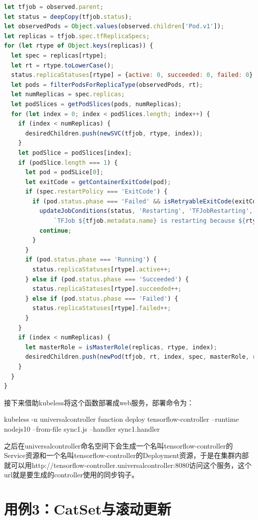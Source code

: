 \documentclass[macfonts,master]{njuthesis}
\begin{document}
\begin{lstlisting}[language=JavaScript,caption=tensorflowjob-controller的实现代码,label=listing:tensorflowjob-controller]
let tfjob = observed.parent;
let status = deepCopy(tfjob.status);
let observedPods = Object.values(observed.children['Pod.v1']);
let replicas = tfjob.spec.tfReplicaSpecs;
for (let rtype of Object.keys(replicas)) {
  let spec = replicas[rtype];
  let rt = rtype.toLowerCase();
  status.replicaStatuses[rtype] = {active: 0, succeeded: 0, failed: 0};
  let pods = filterPodsForReplicaType(observedPods, rt);
  let numReplicas = spec.replicas;
  let podSlices = getPodSlices(pods, numReplicas);
  for (let index = 0; index < podSlices.length; index++) {
    if (index < numReplicas) {
      desiredChildren.push(newSVC(tfjob, rtype, index));
    }
    let podSlice = podSlices[index];
    if (podSlice.length === 1) {
      let pod = podSLice[0];
      let exitCode = getContainerExitCode(pod);
      if (spec.restartPolicy === 'ExitCode') {
        if (pod.status.phase === 'Failed' && isRetryableExitCode(exitCode)) {
          updateJobConditions(status, 'Restarting', 'TFJobRestarting',
              `TFJob ${tfjob.metadata.name} is restarting because ${rtype} replica(s) failed.`);
          continue;
        }
      }
      if (pod.status.phase === 'Running') {
        status.replicaStatuses[rtype].active++;
      } else if (pod.status.phase === 'Succeeded') {
        status.replicaStatuses[rtype].succeeded++;
      } else if (pod.status.phase === 'Failed') {
        status.replicaStatuses[rtype].failed++;
      }
    }
    if (index < numReplicas) {
      let masterRole = isMasterRole(replicas, rtype, index);
      desiredChildren.push(newPod(tfjob, rt, index, spec, masterRole, replicas));
    }
  }
}
\end{lstlisting}



接下来借助kubeless将这个函数部署成web服务，部署命令为：

kubeless -n universalcontroller function deploy tensorflow-controller --runtime nodejs10 --from-file sync1.js --handler sync1.handler

之后在universalcontroller命名空间下会生成一个名叫tensorflow-controller的Service资源和一个名叫tensorflow-controller的Deployment资源，于是在集群内部就可以用http://tensorflow-controller.universalcontroller:8080访问这个服务，这个url就是要生成的controller使用的同步钩子。

\section{用例3：CatSet与滚动更新}\label{section:catset}
\end{document}
